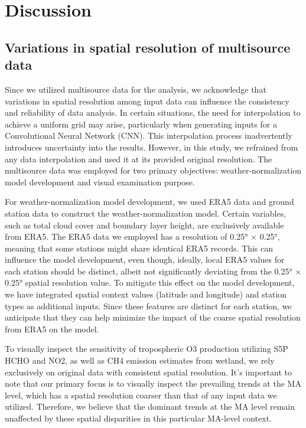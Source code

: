 \section{Discussion} \label{chap4_disscussion}
\subsection{Variations in spatial resolution of multisource data}
Since we utilized multisource data for the analysis, we acknowledge that variations in spatial resolution among input data can influence the consistency and reliability of data analysis. In certain situations, the need for interpolation to achieve a uniform grid may arise, particularly when generating inputs for a Convolutional Neural Network (CNN). This interpolation process inadvertently introduces uncertainty into the results.  However, in this study, we refrained from any data interpolation and used it at its provided original resolution. The multisource data was employed for two primary objectives: weather-normalization model development and visual examination purpose. \par
For weather-normalization model development, we used ERA5 data and ground station data to construct the weather-normalization model. Certain variables, such as total cloud cover and boundary layer height, are exclusively available from ERA5. The ERA5 data we employed has a resolution of 0.25° × 0.25°, meaning that some stations might share identical ERA5 records. This can influence the model development, even though, ideally, local ERA5 values for each station should be distinct, albeit not significantly deviating from the 0.25° × 0.25° spatial resolution value. To mitigate this effect on the model development, we have integrated spatial context values (latitude and longitude) and station types as additional inputs. Since these features are distinct for each station, we anticipate that they can help minimize the impact of the coarse spatial resolution from ERA5 on the model. \par
To visually inspect the sensitivity of tropospheric O3 production utilizing S5P HCHO and NO2, as well as CH4 emission estimates from wetland, we rely exclusively on original data with consistent spatial resolution. It's important to note that our primary focus is to visually inspect the prevailing trends at the MA level, which has a spatial resolution coarser than that of any input data we utilized. Therefore, we believe that the dominant trends at the MA level remain unaffected by these spatial disparities in this particular MA-level context. \par

